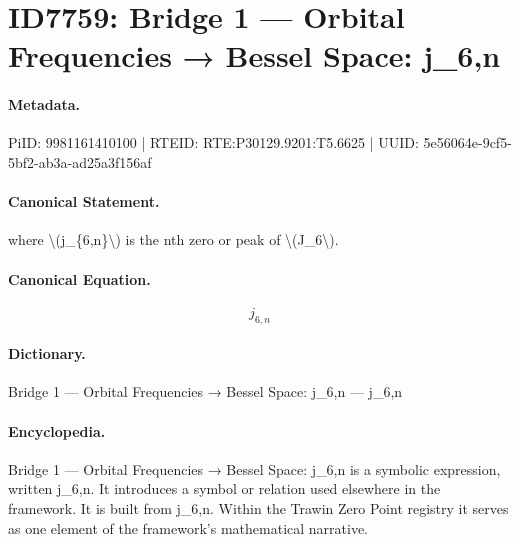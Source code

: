 \section*{ID7759: Bridge 1 — Orbital Frequencies → Bessel Space: j\_6,n}
\paragraph{Metadata.}
PiID: 9981161410100 | RTEID: RTE:P30129.9201:T5.6625 | UUID: 5e56064e-9cf5-5bf2-ab3a-ad25a3f156af

\paragraph{Canonical Statement.}
where \textbackslash{}(j\_\{6,n\}\textbackslash{}) is the nth zero or peak of \textbackslash{}(J\_6\textbackslash{}).

\paragraph{Canonical Equation.}
\[
j_{6,n}
\]

\paragraph{Dictionary.}
Bridge 1 — Orbital Frequencies → Bessel Space: j\_6,n — j\_6,n

\paragraph{Encyclopedia.}
Bridge 1 — Orbital Frequencies → Bessel Space: j\_6,n is a symbolic expression, written j\_6,n. It introduces a symbol or relation used elsewhere in the framework. It is built from j\_6,n. Within the Trawin Zero Point registry it serves as one element of the framework's mathematical narrative.
